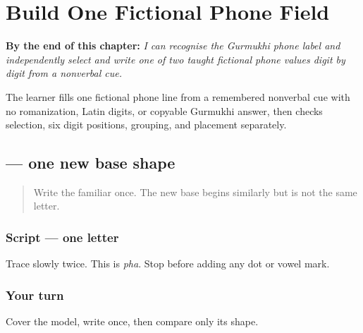 
\chapter{Build One Fictional Phone Field}
\label{ch:pa-form-phone-runway}

\begin{chapteropening}
\textbf{By the end of this chapter:} \emph{I can recognise the Gurmukhi phone label and independently select and write one of two taught fictional phone values digit by digit from a nonverbal cue.}

The learner fills one fictional phone line from a remembered nonverbal cue with no romanization, Latin digits, or copyable Gurmukhi answer, then checks selection, six digit positions, grouping, and placement separately.
\end{chapteropening}

\section[\texorpdfstring{\pa{ਫ} (pha)}{ਫ (pha)}]{ — one new base shape}

\label{lesson:PA-W08-pha}



\begin{quote}
Write the familiar \textbf{} once. The new base begins similarly but is not the same letter.
\end{quote}

\subsection*{Script — one letter}

Trace \textbf{} slowly twice. This is \emph{pha}. Stop before adding any dot or vowel mark.

\subsection*{Your turn}
Cover the model, write \textbf{} once, then compare only its shape.

